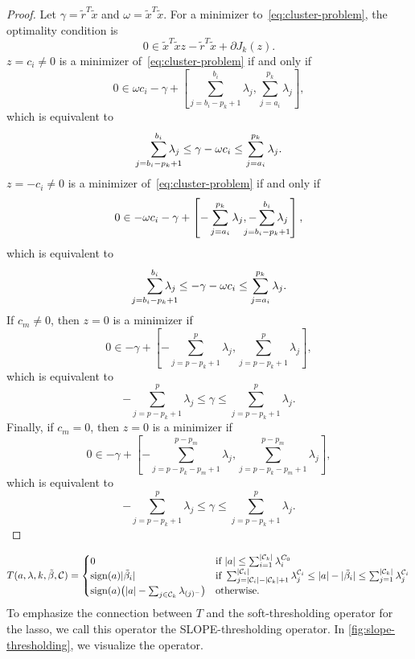 \begin{proof}
  Let \(\gamma = \tilde{r}^T\tilde{x}\) and \(\omega = \tilde{x}^T\tilde{x}\).
  For a minimizer to~\eqref{eq:cluster-problem}, the optimality condition is
  \[
    0 \in \tilde{x}^T\tilde{x} z - \tilde{r}^T \tilde{x} + \partial J_k(z).
  \]
  \(z = c_i \neq 0\) is a minimizer of~\eqref{eq:cluster-problem} if and only if
  \[
    0 \in \omega c_i - \gamma +
    \left[\sum_{j = b_i - p_k + 1}^{b_i} \lambda_j, \sum_{j=a_i}^{p_k}\lambda_j \right],
  \]
  which is equivalent to
  \[
    \smashoperator[r]{\sum_{j = b_i - p_k + 1}^{b_i}} \lambda_j \leq \gamma - \omega c_i \leq \sum_{j = a_i}^{p_k} \lambda_j.
  \]
  \(z = -c_i \neq 0\) is a minimizer of~\eqref{eq:cluster-problem} if and only if
  \[
    0 \in -\omega c_i - \gamma +
    \left[-\sum_{j=a_i}^{p_k}\lambda_j, -\smashoperator{\sum_{j = b_i - p_k + 1}^{b_i}} \lambda_j\,\right],
  \]
  which is equivalent to
  \[
    \smashoperator[r]{\sum_{j = b_i - p_k + 1}^{b_i}} \lambda_j \leq -\gamma - \omega c_i \leq \sum_{j = a_i}^{p_k} \lambda_j.
  \]
  If \(c_m \neq 0\), then \(z = 0\) is a minimizer if
  \[
    0 \in -\gamma +
    \left[-\sum_{j = p - p_k + 1}^{p} \lambda_j, \sum_{j=p - p_k + 1}^{p}\lambda_j \right],
  \]
  which is equivalent to
  \[
    -\sum_{j = p - p_k + 1}^{p} \lambda_j \leq \gamma \leq \sum_{j = p - p_k + 1}^{p} \lambda_j.
  \]
  Finally, if \(c_m = 0\), then \(z = 0\) is a minimizer if
  \[
    0 \in -\gamma +
    \left[
      -\sum_{j = p - p_k - p_m + 1}^{p - p_m} \lambda_j,
      \sum_{j=p - p_k - p_m + 1}^{p - p_m}\lambda_j
      \right],
  \]
  which is equivalent to
  \[
    -\sum_{j = p - p_k + 1}^{p} \lambda_j \leq \gamma \leq \sum_{j = p - p_k + 1}^{p} \lambda_j.
  \]


\end{proof}

\begin{equation}
  \label{eq:slope-thresholding}
  T(a, \lambda,k,\tilde \beta, \mathcal{C}) =
  \begin{cases}
    0                                                                 & \text{if } |a| \leq \sum_{i=1}^{|\mathcal{C}_k|}\lambda^{C_0}_i                                                                                                                               \\
    \operatorname{sign}(a)|\tilde \beta_i|                                          & \text{if } \sum_{j= |\mathcal{C}_i| - |\mathcal{C}_k| + 1}^{|\mathcal{C}_i|} \lambda^{\mathcal{C}_i}_j \leq |a| - |\tilde \beta_i| \leq \sum_{j=1}^{|\mathcal{C}_k|}\lambda^{\mathcal{C}_i}_j \\
    \operatorname{sign}(a)\big(|a| - \sum_{j \in \mathcal{C}_k}\lambda_{(j)^-}\big) & \text{otherwise.
    }
  \end{cases}
\end{equation}
To emphasize the connection between \(T\) and the soft-thresholding operator
for the lasso, we call this operator the SLOPE-thresholding operator.
In \cref{fig:slope-thresholding}, we visualize the operator.

